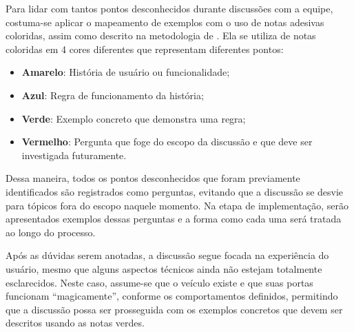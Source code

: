 Para lidar com tantos pontos desconhecidos durante discussões com a equipe, costuma-se aplicar o mapeamento de exemplos com o uso de notas adesivas coloridas, 
assim como descrito na metodologia de \cite{cucumberExampleMapping}. Ela se utiliza de notas coloridas em 4 cores diferentes que representam diferentes pontos:

\begin{itemize}
	\item \textbf{Amarelo}: História de usuário ou funcionalidade;
	\item \textbf{Azul}: Regra de funcionamento da história;
	\item \textbf{Verde}: Exemplo concreto que demonstra uma regra;
	\item \textbf{Vermelho}: Pergunta que foge do escopo da discussão e que deve ser investigada futuramente.
\end{itemize}

Dessa maneira, todos os pontos desconhecidos que foram previamente identificados são registrados como perguntas, evitando que a discussão se desvie para tópicos 
fora do escopo naquele momento. Na etapa de implementação, serão apresentados exemplos dessas perguntas e a forma como cada uma será tratada ao longo do processo.

Após as dúvidas serem anotadas, a discussão segue focada na experiência do usuário, mesmo que alguns aspectos técnicos ainda não estejam totalmente esclarecidos. 
Neste caso, assume-se que o veículo existe e que suas portas funcionam “magicamente”, conforme os comportamentos definidos, permitindo que a discussão possa ser 
prosseguida com os exemplos concretos que devem ser descritos usando as notas verdes.





